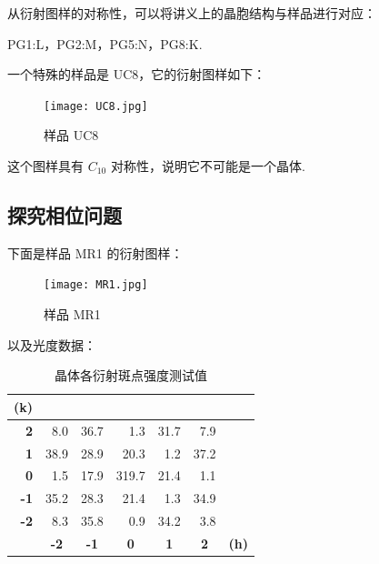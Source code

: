 \documentclass{customDoc}
\begin{document}
从衍射图样的对称性，可以将讲义上的晶胞结构与样品进行对应：\newline


PG1:L，PG2:M，PG5:N，PG8:K.\newline


一个特殊的样品是 UC8，它的衍射图样如下：

\begin{figure}[H]
    \centering
    \texttt{[image: UC8.jpg]}
    \caption{样品 UC8}
    \label{fig:UC8}
\end{figure}

这个图样具有 $C_{10}$ 对称性，说明它不可能是一个晶体.

\subsection{探究相位问题}

下面是样品 MR1 的衍射图样：

\begin{figure}[H]
    \centering
    \texttt{[image: MR1.jpg]}
    \caption{样品 MR1}
    \label{fig:MR1}
\end{figure}

以及光度数据：

\begin{table}[H]
  \centering
    \begin{tabular}{|r|c|c|c|c|c|l|}
    \hline
    \textbf{(k)} &       &       &       &       &       &  \\
    \hline
    \textbf{2} & \multicolumn{1}{r|}{8.0} & \multicolumn{1}{r|}{36.7} & \multicolumn{1}{r|}{1.3} & \multicolumn{1}{r|}{31.7} & \multicolumn{1}{r|}{7.9} &  \\
    \hline
    \textbf{1} & \multicolumn{1}{r|}{38.9} & \multicolumn{1}{r|}{28.9} & \multicolumn{1}{r|}{20.3} & \multicolumn{1}{r|}{1.2} & \multicolumn{1}{r|}{37.2} &  \\
    \hline
    \textbf{0} & \multicolumn{1}{r|}{1.5} & \multicolumn{1}{r|}{17.9} & \multicolumn{1}{r|}{319.7} & \multicolumn{1}{r|}{21.4} & \multicolumn{1}{r|}{1.1} &  \\
    \hline
    \textbf{-1} & \multicolumn{1}{r|}{35.2} & \multicolumn{1}{r|}{28.3} & \multicolumn{1}{r|}{21.4} & \multicolumn{1}{r|}{1.3} & \multicolumn{1}{r|}{34.9} &  \\
    \hline
    \textbf{-2} & \multicolumn{1}{r|}{8.3} & \multicolumn{1}{r|}{35.8} & \multicolumn{1}{r|}{0.9} & \multicolumn{1}{r|}{34.2} & \multicolumn{1}{r|}{3.8} &  \\
    \hline
          & \textbf{-2} & \textbf{-1} & \textbf{0} & \textbf{1} & \textbf{2} & \textbf{(h)} \\
    \hline
    \end{tabular}%
    \caption{晶体各衍射斑点强度测试值}
  \label{tab:4}%
\end{table}%
\end{document}
